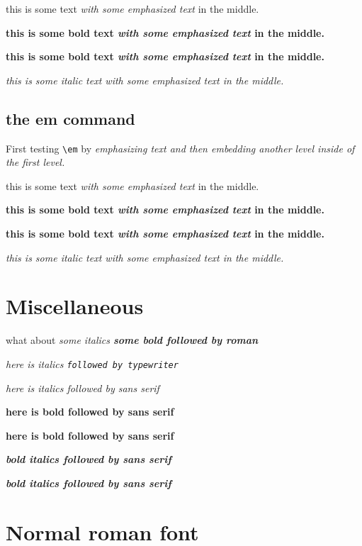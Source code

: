 \documentclass{article}
\begin{document}
this is some text \emph{with some emphasized text} in the middle.

{\bf this is some bold text \emph{with some emphasized text} in the middle.}

\textbf{this is some bold text \emph{with some emphasized text} in the middle.}

\textit{this is some italic text \emph{with some emphasized text} in the middle.}

\subsection{the em command}

First testing \verb#\em# by {\em emphasizing text and then {\em embedding another
level inside} of the first level.}

this is some text {\em with some emphasized text} in the middle.

{\bf this is some bold text {\em with some emphasized text} in the middle.}

\textbf{this is some bold text {\em with some emphasized text} in the middle.}

\textit{this is some italic text {\em with some emphasized text} in the middle.}

\section{Miscellaneous}
what about \it some italics \bf some bold \rm followed by roman

{\it here is italics \tt followed by typewriter}

{\it here is italics \sf followed by sans serif}

\textbf{here is bold \sf followed by sans serif}

{\bf here is bold \textsf{followed by sans serif}}

\textbf{\textit{bold italics \sf followed by sans serif}}

\textbf{\textit{bold italics \textsf{followed by sans serif}}}


\section{Normal roman font}
\end{document}
